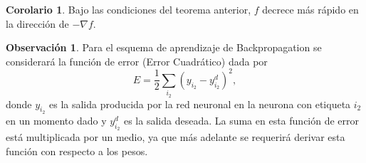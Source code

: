 \documentclass[11pt,letterpaper]{article}
\theoremstyle{definition}
\theoremstyle{definition}
\theoremstyle{definition}
\theoremstyle{definition}
\newtheorem{obs}{Observación}
\theoremstyle{definition}
\theoremstyle{definition}
\theoremstyle{definition}
\theoremstyle{definition}
\newtheorem{cor}{Corolario}
\begin{document}
\begin{cor}\label{col2}
	Bajo las condiciones del teorema anterior, $ f $ decrece más rápido en la dirección de $ -\nabla f $.
\end{cor}
\begin{obs}
	Para el esquema de aprendizaje de Backpropagation se considerará la funci\'on de error (Error Cuadrático) dada por 
	\begin{equation*}
		E=\dfrac{1}{2}\sum_{i_2} (y_{i_2}-y_{i_2}^d)^2,
	\end{equation*}
	donde $ y_{i_2} $ es la salida producida por la red neuronal en la neurona con etiqueta $ i_2 $ en un momento dado y $ y_{i_2}^d $  es la salida deseada. La suma en esta función de error está multiplicada por un medio, ya que más adelante se requerirá derivar esta función con respecto a los pesos.
\end{obs}
\end{document}
